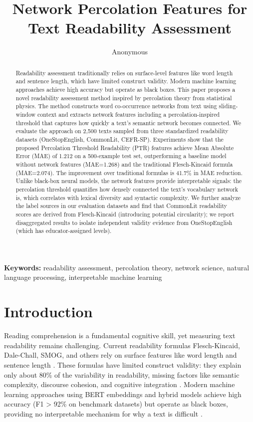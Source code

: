 \documentclass[11pt,letterpaper]{article}
\title{Network Percolation Features for Text Readability Assessment}
\author{Anonymous}
\date{}
\begin{document}
\maketitle

\begin{abstract}
Readability assessment traditionally relies on surface-level features like word length and sentence length, which have limited construct validity. Modern machine learning approaches achieve high accuracy but operate as black boxes. This paper proposes a novel readability assessment method inspired by percolation theory from statistical physics. The method constructs word co-occurrence networks from text using sliding-window context and extracts network features including a percolation-inspired threshold that captures how quickly a text's semantic network becomes connected. We evaluate the approach on 2,500 texts sampled from three standardized readability datasets (OneStopEnglish, CommonLit, CEFR-SP). Experiments show that the proposed Percolation Threshold Readability (PTR) features achieve Mean Absolute Error (MAE) of 1.212 on a 500-example test set, outperforming a baseline model without network features (MAE=1.268) and the traditional Flesch-Kincaid formula (MAE=2.074). The improvement over traditional formulas is 41.7\% in MAE reduction. Unlike black-box neural models, the network features provide interpretable signals: the percolation threshold quantifies how densely connected the text's vocabulary network is, which correlates with lexical diversity and syntactic complexity. We further analyze the label sources in our evaluation datasets and find that CommonLit readability scores are derived from Flesch-Kincaid (introducing potential circularity); we report disaggregated results to isolate independent validity evidence from OneStopEnglish (which has educator-assigned levels).
\end{abstract}

\noindent\textbf{Keywords:} readability assessment, percolation theory, network science, natural language processing, interpretable machine learning

\section{Introduction}

Reading comprehension is a fundamental cognitive skill, yet measuring text readability remains challenging. Current readability formulas Flesch-Kincaid, Dale-Chall, SMOG, and others rely on surface features like word length and sentence length \cite{Flesch1948,Dale1948,McLaughlin1969,Senter1967}. These formulas have limited construct validity: they explain only about 80\% of the variability in readability, missing factors like semantic complexity, discourse cohesion, and cognitive integration \cite{CollinsThompson2014,Redish2000}. Modern machine learning approaches using BERT embeddings and hybrid models achieve high accuracy (F1 > 92\% on benchmark datasets) but operate as black boxes, providing no interpretable mechanism for why a text is difficult \cite{Li2022,Liu2023}.
\end{document}
